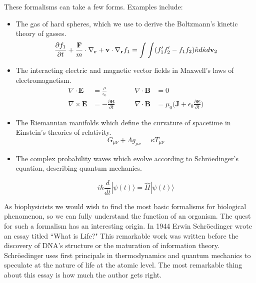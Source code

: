 These formalisms can take a few forms. Examples include:
\begin{itemize}
\item The gas of hard spheres, which we use to derive the Boltzmann's kinetic theory of gasses.  
\begin{equation}
	\label{hard_spheres}
	\frac{\partial f_1}{\partial t} + \frac{\bold{F}}{m}\cdot\nabla_\bold{r} + \bold{v} \cdot \nabla_\bold{r} f_1 =  \int \int (f'_1f'_2 - f_1 f_2) \tilde \kappa d \hat \kappa d \bold{v}_2
\end{equation}

\item The interacting electric and magnetic vector fields in Maxwell's laws of electromagnetism.
\begin{equation}
	\begin{aligned}
		\nabla \cdot  \mathbf{E} &= \frac{\rho}{\epsilon_0} \qquad & \nabla \cdot  \mathbf{B} &= 0 \\
		\nabla \times  \mathbf{E} &= -\frac{\partial \mathbf{B}}{\partial t} \qquad &  \nabla \cdot  \mathbf{B} &= \mu_0 \big(\mathbf{J} + \epsilon_0 \frac{\partial \mathbf{E} } {\partial t }\big)
	\end{aligned}
\end{equation}

\item The Riemannian manifolds which define the curvature of spacetime in Einstein's theories of relativity.
\begin{equation}
	G_{\mu \nu} + \Lambda g_{\mu \nu} = \kappa T_{\mu \nu}
\end{equation}

\item The complex probability waves which evolve according to Schr\"oedinger's equation, describing quantum mechanics. 

\begin{equation}
	i \hbar \frac{d}{dt} | \psi (t) \rangle = \hat {H} | \psi (t) \rangle 
\end{equation}
\end{itemize}

As biophysicists we would wish to find the most basic formalisms for biological phenomenon, so we can fully understand the function of an organism. The quest for such a formalism has an interesting origin. In 1944 Erwin Schr\"oedinger wrote an essay titled ``What is Life?" This remarkable work was written before the discovery of DNA's structure or the maturation of information theory. Schr\"oedinger uses first principals in thermodynamics and quantum mechanics to speculate at the nature of life at the atomic level. The most remarkable thing about this essay is how much the author gets right. 

